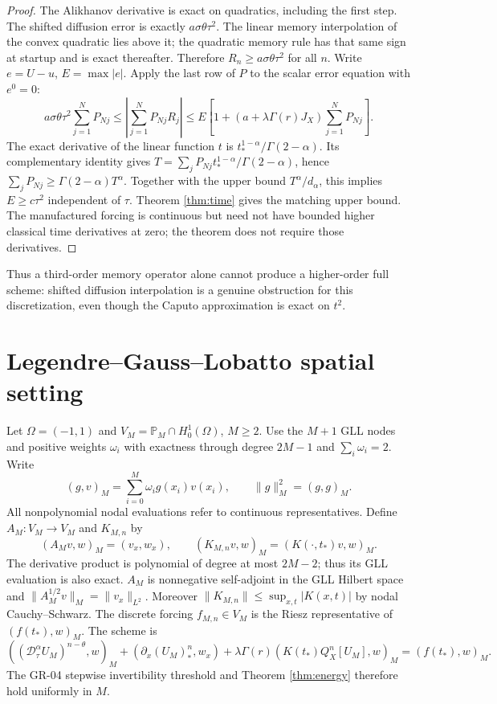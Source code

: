 \documentclass[11pt,a4paper]{article}
\newcommand{\norm}[1]{\lVert#1\rVert}
\newcommand{\D}{\mathcal D_\tau^\alpha}
\begin{document}
\begin{proof}
The Alikhanov derivative is exact on quadratics, including the first step. The shifted diffusion error is exactly $a\sigma\theta\tau^2$. The linear memory interpolation of the convex quadratic lies above it; the quadratic memory rule has that same sign at startup and is exact thereafter. Therefore $R_n\ge a\sigma\theta\tau^2$ for all $n$. Write $e=U-u$, $E=\max|e|$. Apply the last row of $P$ to the scalar error equation with $e^0=0$:
\[
 a\sigma\theta\tau^2\sum_{j=1}^NP_{Nj}
 \le \left|\sum_{j=1}^NP_{Nj}R_j\right|
 \le E\left[1+(a+\lambda\Gamma(r)J_X)\sum_{j=1}^NP_{Nj}\right].
\]
The exact derivative of the linear function $t$ is $t_*^{1-\alpha}/\Gamma(2-\alpha)$. Its complementary identity gives $T=\sum_j P_{Nj}t_*^{1-\alpha}/\Gamma(2-\alpha)$, hence $\sum_jP_{Nj}\ge\Gamma(2-\alpha)T^\alpha$. Together with the upper bound $T^\alpha/d_\alpha$, this implies $E\ge c\tau^2$ independent of $\tau$. Theorem \ref{thm:time} gives the matching upper bound. The manufactured forcing is continuous but need not have bounded higher classical time derivatives at zero; the theorem does not require those derivatives.
\end{proof}
Thus a third-order memory operator alone cannot produce a higher-order full scheme: shifted diffusion interpolation is a genuine obstruction for this discretization, even though the Caputo approximation is exact on $t^2$.
\section{Legendre--Gauss--Lobatto spatial setting}
Let $\Omega=(-1,1)$ and $V_M=\mathbb P_M\cap H_0^1(\Omega)$, $M\ge2$. Use the $M+1$ GLL nodes and positive weights $\omega_i$ with exactness through degree $2M-1$ and $\sum_i\omega_i=2$. Write
\[
 (g,v)_M=\sum_{i=0}^M\omega_i g(x_i)v(x_i),\qquad \norm{g}_M^2=(g,g)_M.
\]
All nonpolynomial nodal evaluations refer to continuous representatives. Define $A_M:V_M\to V_M$ and $K_{M,n}$ by
\[
 (A_Mv,w)_M=(v_x,w_x),\qquad (K_{M,n}v,w)_M=(K(\cdot,t_*)v,w)_M.
\]
The derivative product is polynomial of degree at most $2M-2$; thus its GLL evaluation is also exact. $A_M$ is nonnegative self-adjoint in the GLL Hilbert space and $\norm{A_M^{1/2}v}_M=\norm{v_x}_{L^2}$. Moreover $\norm{K_{M,n}}\le\sup_{x,t}|K(x,t)|$ by nodal Cauchy--Schwarz. The discrete forcing $f_{M,n}\in V_M$ is the Riesz representative of $(f(t_*),w)_M$. The scheme is
\begin{equation}\label{eq:full}
 ((\D U_M)^{n-\theta},w)_M+(\partial_x (U_M)_*^n,w_x)
 +\lambda\Gamma(r)(K(t_*)Q_X^n[U_M],w)_M=(f(t_*),w)_M.
\end{equation}
The GR-04 stepwise invertibility threshold and Theorem \ref{thm:energy} therefore hold uniformly in $M$.
\end{document}
